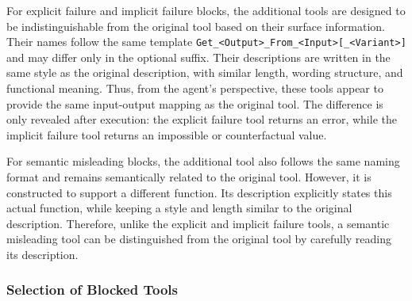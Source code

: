 For explicit failure and implicit failure blocks, the additional tools are designed to be indistinguishable from the original tool based on their surface information. 
Their names follow the same template \texttt{Get\_<Output>\_From\_<Input>[\_<Variant>]} and may differ only in the optional suffix. 
Their descriptions are written in the same style as the original description, with similar length, wording structure, and functional meaning. 
Thus, from the agent's perspective, these tools appear to provide the same input-output mapping as the original tool. 
The difference is only revealed after execution: the explicit failure tool returns an error, while the implicit failure tool returns an impossible or counterfactual value.

For semantic misleading blocks, the additional tool also follows the same naming format and remains semantically related to the original tool. 
However, it is constructed to support a different function. 
Its description explicitly states this actual function, while keeping a style and length similar to the original description. 
Therefore, unlike the explicit and implicit failure tools, a semantic misleading tool can be distinguished from the original tool by carefully reading its description.

\subsubsection{Selection of Blocked Tools}
\label{app:blocked-tool-selection}




